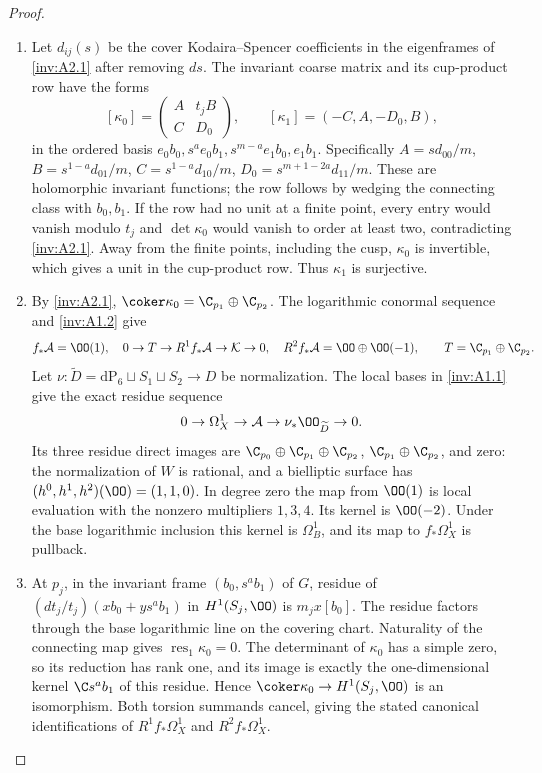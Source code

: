 \begin{proof}
\begin{enumerate}[label=\arabic*.,leftmargin=*]
\item Let $d_{ij}(s)$ be the cover Kodaira--Spencer coefficients in the
eigenframes of \cref{inv:A2.1} after removing $ds$.
The invariant coarse matrix and its cup-product row have the forms
\[
[\kappa_0]=\begin{pmatrix}A&t_jB\\C&D_0\end{pmatrix},\qquad
[\kappa_1]=(-C,A,-D_0,B),
\]
in the ordered basis
$e_0b_0,s^ae_0b_1,s^{m-a}e_1b_0,e_1b_1$. Specifically
$A=sd_{00}/m$, $B=s^{1-a}d_{01}/m$,
$C=s^{1-a}d_{10}/m$, $D_0=s^{m+1-2a}d_{11}/m$.
These are holomorphic invariant functions; the row follows by
wedging the connecting class with $b_0,b_1$.
If the row had no unit at a finite point, every entry would vanish
modulo $t_j$ and $\det\kappa_0$ would vanish to order at least two,
contradicting \cref{inv:A2.1}. Away from the finite points, including
the cusp, $\kappa_0$ is invertible, which gives a unit in the
cup-product row. Thus $\kappa_1$ is surjective.

\item By \cref{inv:A2.1},
$\coker\kappa_0=\C_{p_1}\oplus\C_{p_2}$.
The logarithmic conormal sequence and \cref{inv:A1.2} give
\[
f_*\mathcal A=\OO(1),\quad
0\to T\to R^1f_*\mathcal A\to\mathcal K\to0,\quad
R^2f_*\mathcal A=\OO\oplus\OO(-1),\qquad
T=\C_{p_1}\oplus\C_{p_2}.
\]
Let $\nu:\widetilde D=\mathrm{dP}_6\sqcup S_1\sqcup S_2\to D$
be normalization. The local bases in \cref{inv:A1.1} give the exact
residue sequence
\[
0\to\Omega_X^1\to\mathcal A\to\nu_*\OO_{\widetilde D}\to0.
\]
Its three residue direct images are
$\C_{p_0}\oplus\C_{p_1}\oplus\C_{p_2}$,
$\C_{p_1}\oplus\C_{p_2}$, and zero: the normalization of $W$ is
rational, and a bielliptic surface has
$(h^0,h^1,h^2)(\OO)=(1,1,0)$.
In degree zero the map from $\OO(1)$ is local evaluation with the
nonzero multipliers $1,3,4$. Its kernel is $\OO(-2)$.
Under the base logarithmic inclusion this kernel is $\Omega_B^1$,
and its map to $f_*\Omega_X^1$ is pullback.

\item At $p_j$, in the invariant frame $(b_0,s^ab_1)$ of $G$, residue
of $(dt_j/t_j)(x b_0+y s^ab_1)$ in $H^1(S_j,\OO)$ is
$m_jx[b_0]$. The residue factors through the base logarithmic line
on the covering chart. Naturality of the connecting map gives
$\operatorname{res}_1\kappa_0=0$.
The determinant of $\kappa_0$ has a simple zero, so its reduction
has rank one, and its image is exactly the one-dimensional kernel
$\C s^ab_1$ of this residue. Hence
$\coker\kappa_0\to H^1(S_j,\OO)$ is an isomorphism.
Both torsion summands cancel, giving the stated canonical
identifications of $R^1f_*\Omega_X^1$ and $R^2f_*\Omega_X^1$.


\end{enumerate}
\end{proof}
